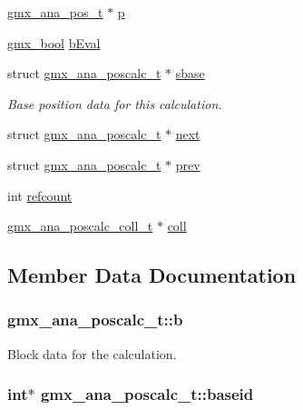 \begin{DoxyCompactItemize}
\hyperlink{structgmx__ana__pos__t}{gmx\-\_\-ana\-\_\-pos\-\_\-t} $\ast$ \hyperlink{structgmx__ana__poscalc__t_af8e621e3296236f51d768438758b7cfe}{p}
\item 
\hyperlink{include_2types_2simple_8h_a8fddad319f226e856400d190198d5151}{gmx\-\_\-bool} \hyperlink{structgmx__ana__poscalc__t_a7c6bb76585fe8302b61fee5fbc043f01}{b\-Eval}
\item 
struct \hyperlink{structgmx__ana__poscalc__t}{gmx\-\_\-ana\-\_\-poscalc\-\_\-t} $\ast$ \hyperlink{structgmx__ana__poscalc__t_a8b9a27a793b47d53dfa203da5c01c546}{sbase}
\begin{DoxyCompactList}\small\item\em \-Base position data for this calculation. \end{DoxyCompactList}\item 
struct \hyperlink{structgmx__ana__poscalc__t}{gmx\-\_\-ana\-\_\-poscalc\-\_\-t} $\ast$ \hyperlink{structgmx__ana__poscalc__t_a7361a5bb17a15c573e5b5986583761af}{next}
\item 
struct \hyperlink{structgmx__ana__poscalc__t}{gmx\-\_\-ana\-\_\-poscalc\-\_\-t} $\ast$ \hyperlink{structgmx__ana__poscalc__t_a573eeaa2a637cb914a06734a9db4d656}{prev}
\item 
int \hyperlink{structgmx__ana__poscalc__t_a3b4ef518ccc2a2d73f4b6ec7c51ac4c8}{refcount}
\item 
\hyperlink{structgmx__ana__poscalc__coll__t}{gmx\-\_\-ana\-\_\-poscalc\-\_\-coll\-\_\-t} $\ast$ \hyperlink{structgmx__ana__poscalc__t_a73aee440ed9973613bbc1fb44a6630b6}{coll}
\end{DoxyCompactItemize}


\subsection{\-Member \-Data \-Documentation}
\hypertarget{structgmx__ana__poscalc__t_a1518e903b1d377405ca5ee6c9251ae3f}{
\subsubsection[{b}]{ {\bf gmx\-\_\-ana\-\_\-poscalc\-\_\-t\-::b}}}\label{structgmx__ana__poscalc__t_a1518e903b1d377405ca5ee6c9251ae3f}


\-Block data for the calculation. 

\hypertarget{structgmx__ana__poscalc__t_ae07c26738181ffe6a413e57ed6e5bd64}{
\subsubsection[{baseid}]{\setlength{\rightskip}{0pt plus 5cm}int$\ast$ {\bf gmx\-\_\-ana\-\_\-poscalc\-\_\-t\-::baseid}}}\label{structgmx__ana__poscalc__t_ae07c26738181ffe6a413e57ed6e5bd64}


